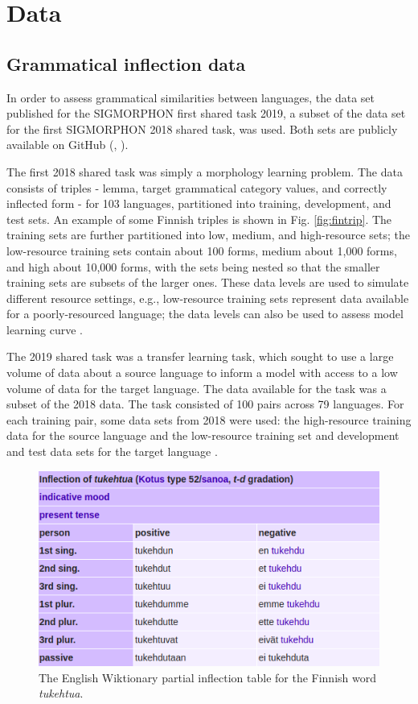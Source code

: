 \chapter{Data}

\section{Grammatical inflection data}

In order to assess grammatical similarities between languages, the data set published for the SIGMORPHON first shared task 2019, a subset of the data set for the first SIGMORPHON 2018 shared task, was used. Both sets are publicly available on GitHub (\cite{McCarthy2019}, \cite{Cotterell2018b}).

The first 2018 shared task was simply a morphology learning problem. The data consists of triples - lemma, target grammatical category values, and correctly inflected form - for 103 languages, partitioned into training, development, and test sets. An example of some Finnish triples is shown in Fig. \ref{fig:fintrip}. The training sets are further partitioned into low, medium, and high-resource sets; the low-resource training sets contain about 100 forms, medium about 1,000 forms, and high about 10,000 forms, with the sets being nested so that the smaller training sets are subsets of the larger ones. These data levels are used to simulate different resource settings, e.g., low-resource training sets represent data available for a poorly-resourced language; the data levels can also be used to assess model learning curve \parencite{Cotterell2018b}.

The 2019 shared task was a transfer learning task, which sought to use a large volume of data about a source language to inform a model with access to a low volume of data for the target language. The data available for the task was a subset of the 2018 data. The task consisted of 100 pairs across 79 languages. For each training pair, some data sets from 2018 were used: the high-resource training data for the source language and the low-resource training set and development and test data sets for the target language \parencite{McCarthy2019}.

\begin{figure}[ht]
\includegraphics[width=12cm]{images/tukehtua.png}
\centering
\caption{The English Wiktionary partial inflection table for the Finnish word \textit{tukehtua}.}
\label{fig:wikt}
\end{figure}

